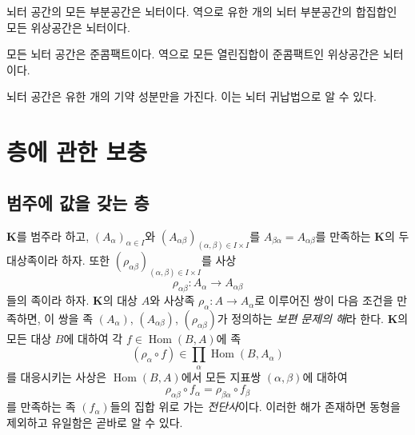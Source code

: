 \begin{env}[2.2.3]
\label{0.2.2.3-ko}
뇌터 공간의 모든 부분공간은 뇌터이다. 역으로 유한 개의 뇌터 부분공간의 합집합인 모든 위상공간은 뇌터이다.
\end{env}

\begin{env}[2.2.4]
\label{0.2.2.4-ko}
모든 뇌터 공간은 준콤팩트이다. 역으로 모든 열린집합이 준콤팩트인 위상공간은 뇌터이다.
\end{env}

\begin{env}[2.2.5]
\label{0.2.2.5-ko}
뇌터 공간은 유한 개의 기약 성분만을 가진다. 이는 뇌터 귀납법으로 알 수 있다.
\end{env}

\section{층에 관한 보충}
\label{section:0.3-ko}

\subsection{범주에 값을 갖는 층}
\label{subsection:0.3.1-ko}

\begin{env}[3.1.1]
\label{0.3.1.1-ko}
$\mathbf K$를 범주라 하고, $(A_\alpha)_{\alpha\in I}$와 $(A_{\alpha\beta})_{(\alpha,\beta)\in I\times I}$를 $A_{\beta\alpha}=A_{\alpha\beta}$를 만족하는 $\mathbf K$의 두 대상족이라 하자. 또한 $(\rho_{\alpha\beta})_{(\alpha,\beta)\in I\times I}$를 사상
\[
  \rho_{\alpha\beta}:A_\alpha\longrightarrow A_{\alpha\beta}
\]
들의 족이라 하자. $\mathbf K$의 대상 $A$와 사상족 $\rho_\alpha:A\to A_\alpha$로 이루어진 쌍이 다음 조건을 만족하면, 이 쌍을 족 $(A_\alpha)$, $(A_{\alpha\beta})$, $(\rho_{\alpha\beta})$가 정의하는 \emph{보편 문제의 해}라 한다. $\mathbf K$의 모든 대상 $B$에 대하여 각 $f\in\operatorname{Hom}(B,A)$에 족
\[
  (\rho_\alpha\circ f)\in
  \prod_\alpha\operatorname{Hom}(B,A_\alpha)
\]
를 대응시키는 사상은 $\operatorname{Hom}(B,A)$에서 모든 지표쌍 $(\alpha,\beta)$에 대하여
\[
  \rho_{\alpha\beta}\circ f_\alpha
  =\rho_{\beta\alpha}\circ f_\beta
\]
를 만족하는 족 $(f_\alpha)$들의 집합 위로 가는 \emph{전단사}이다. 이러한 해가 존재하면 동형을 제외하고 유일함은 곧바로 알 수 있다.
\end{env}

